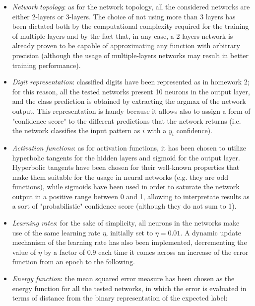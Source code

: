 \documentclass[letterpaper,headings=standardclasses]{scrartcl}
\begin{document}
\begin{itemize}
    
    \item \emph{Network topology}: as for the network topology, all the considered networks are either 2-layers or 3-layers. The choice of not using more than 3 layers has been dictated both by the computational complexity required for the training of multiple layers and by the fact that, in any case, a 2-layers network is already proven to be capable of approximating any function with arbitrary precision (although the usage of multiple-layers networks may result in better training performance).
    
    \item \emph{Digit representation}: classified digits have been represented as in homework 2; for this reason, all the tested networks present 10 neurons in the output layer, and the class prediction is obtained by extracting the argmax of the network output. This representation is handy because it allows also to assign a form of "confidence score" to the different predictions that the network returns (i.e. the network classifies the input pattern as $i$ with a $y_i$ confidence).
    
    \item \emph{Activation functions}: as for activation functions, it has been chosen to utilize hyperbolic tangents for the hidden layers and sigmoid for the output layer. Hyperbolic tangents have been chosen for their well-known properties that make them suitable for the usage in neural networks (e.g. they are odd functions), while sigmoids have been used in order to saturate the network output in a positive range between 0 and 1, allowing to interpretate results as a sort of "probabilistic" confidence score (although they do not sum to 1).
    
    \item \emph{Learning rates}: for the sake of simplicity, all neurons in the networks make use of the same learning rate $\eta$, initially set to $\eta = 0.01$. A dynamic update mechanism of the learning rate has also been implemented, decrementing the value of $\eta$ by a factor of 0.9 each time it comes across an increase of the error function from an epoch to the following.
    
    \item \emph{Energy function}: the mean squared error measure has been chosen as the energy function for all the tested networks, in which the error is evaluated in terms of distance from the binary representation of the expected label:
    

\end{itemize}
\end{document}
